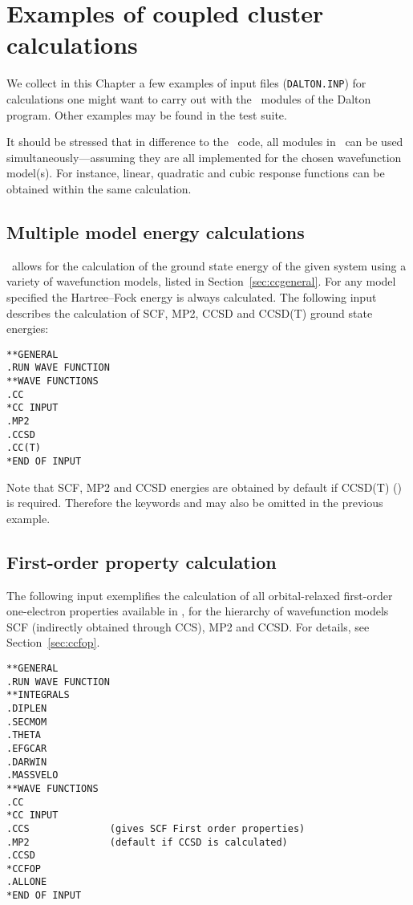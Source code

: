 \chapter{Examples of coupled cluster calculations}
\label{ch:ccexamples}

We collect in this Chapter a few examples of input files (\verb|DALTON.INP|) 
for calculations one might want to carry 
out with the \cc\ modules of the Dalton program.
Other examples may be found in the test suite. 

It should be stressed that in difference to the \resp \ code,
all modules in \cc \ can be used 
simultaneously---assuming they are all implemented
for the chosen wavefunction model(s).
For instance,  linear, quadratic and cubic response functions 
can be obtained within the same calculation.

\section{Multiple model energy calculations}
%
\cc\  allows for the calculation of the ground state energy
of the given system using a variety of wavefunction models, listed in 
Section~\ref{sec:ccgeneral}. 
For any model specified the Hartree--Fock energy is always calculated. 
The following input describes the calculation of SCF, MP2, CCSD and 
CCSD(T) ground state energies:
%
\begin{verbatim}
**GENERAL
.RUN WAVE FUNCTION
**WAVE FUNCTIONS
.CC
*CC INPUT
.MP2              
.CCSD
.CC(T)
*END OF INPUT
\end{verbatim}
Note that SCF, MP2 and CCSD energies are obtained by default if 
CCSD(T) () is required. Therefore the 
keywords  and 
may also be omitted in the previous example.

\section{First-order property calculation}

The following input exemplifies the calculation of all orbital-relaxed
first-order one-electron properties available in \cc, for the hierarchy of 
wavefunction models SCF (indirectly obtained through CCS), MP2 and CCSD.
For details, see Section~\ref{sec:ccfop}.
\begin{verbatim}
**GENERAL
.RUN WAVE FUNCTION
**INTEGRALS
.DIPLEN
.SECMOM
.THETA
.EFGCAR
.DARWIN
.MASSVELO
**WAVE FUNCTIONS
.CC
*CC INPUT
.CCS              (gives SCF First order properties)
.MP2              (default if CCSD is calculated)
.CCSD
*CCFOP
.ALLONE
*END OF INPUT
\end{verbatim}

